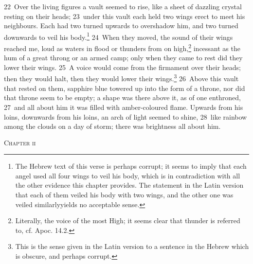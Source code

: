 \documentclass[10pt]{book} %
\begin{document}
\textcolor{benred8}{22}~Over the living figures a vault seemed to rise, like a sheet of dazzling crystal resting on their heads; \textcolor{benred8}{23}~under this vault each held two wings erect to meet his neighbour\textquotesingle s. Each had two turned upwards to overshadow him, and two turned downwards to veil his body.\footnote[5]{The Hebrew text of this verse is perhaps corrupt; it seems to imply that each angel used all four wings to veil his body, which is in contradiction with all the other evidence this chapter provides. The statement in the Latin version that \textasciigrave each of them veiled his body with two wings, and the other one was veiled similarly\textquotesingle  yields no acceptable sense.} \textcolor{benred8}{24}~When they moved, the sound of their wings reached me, loud as waters in flood or thunders from on high,\footnote[6]{Literally, \textasciigrave the voice of the most High\textquotesingle ; it seems clear that thunder is referred to, cf. Apoc. 14.2.} incessant as the hum of a great throng or an armed camp; only when they came to rest did they lower their wings. \textcolor{benred8}{25}~A voice would come from the firmament over their heads; then they would halt, then they would lower their wings.\footnote[7]{This is the sense given in the Latin version to a sentence in the Hebrew which is obscure, and perhaps corrupt.} \textcolor{benred8}{26}~Above this vault that rested on them, sapphire blue towered up into the form of a throne, nor did that throne seem to be empty; a shape was there above it, as of one enthroned, \textcolor{benred8}{27}~and all about him it was filled with amber-coloured flame. Upwards from his loins, downwards from his loins, an arch of light seemed to shine, \textcolor{benred8}{28}~like rainbow among the clouds on a day of storm; there was brightness all about him.
\begin{large}\begin{center}\textsc{Chapter ii}\end{center}\end{large}
\end{document}
